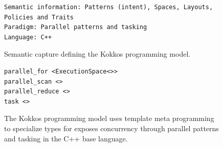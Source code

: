 
\begin{figure}[h]
\begin{Verbatim}[frame=leftline]
Semantic information: Patterns (intent), Spaces, Layouts, 
Policies and Traits
Paradigm: Parallel patterns and tasking
Language: C++
\end{Verbatim}
\caption{Semantic capture defining the Kokkos programming model.}
\label{figSemCapture}
\end{figure}

\begin{figure}
\begin{Verbatim}[frame=leftline]
parallel_for <ExecutionSpace<>>
parallel_scan <>
parallel_reduce <>
task <>
\end{Verbatim}
\caption{The Kokkos programming model uses template meta programming to specialize types for  exposes concurrency through parallel patterns and tasking in the C++ base language.}
\label{fig}
\end{figure}



